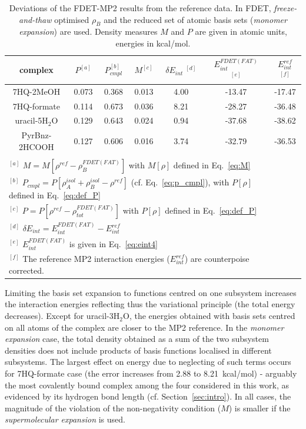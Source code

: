 \documentclass[amsmath,amssymb,preprint,aip,jcp]{revtex4-1}
\begin{document}
\begin{table}
{
\begin{center}
\begin{tabular}{|c|c|c|c|c|c|c|}
\hline
 complex & $P^{[a]}$ & $P_{cmpl}^{[b]}$ & $M^{[c]}$ & $\delta E_{int}\;^{[d]}$ & $E^{FDET(FAT)}_{int}$ $^{[e]}$ & $E_{int}^{ref}$ $^{[f]}$ \\ \hline
7HQ-2MeOH & 0.073 & 0.368 & 0.013 & 4.00 & -13.47 & -17.47 \\ \hline
7HQ-formate & 0.114 & 0.673 & 0.036 & 8.21 & -28.27 & -36.48 \\ \hline
uracil-5H$_2$O & 0.129 & 0.643 & 0.024 & 0.94 & -37.68 & -38.62 \\ \hline
PyrBnz-2HCOOH & 0.127 & 0.606 & 0.016 & 3.74 & -32.79 & -36.53 \\ \hline
\multicolumn{6}{c}{ } \\
\multicolumn{6}{l}{$^{[a]}$ $M=M[\rho^{ref} - \rho^{FDET(FAT)}_{B}]$ with $M[\rho]$ defined in Eq.~\ref{eq:M}}\\
\multicolumn{6}{l}{$^{[b]}$ $P_{cmpl}=P[\rho_A^{isol}+\rho_B^{isol} - \rho^{ref}]$ (cf. Eq.~\ref{eq:p_cmpl}), with $P[\rho]$ defined in Eq.~\ref{eq:def_P}}\\
\multicolumn{6}{l}{$^{[c]}$ $P=P[\rho^{ref} - \rho_{tot}^{FDET(FAT)}]$ with $P[\rho]$ defined in Eq.~\ref{eq:def_P}}\\
\multicolumn{6}{l}{$^{[d]}$ $\delta E_{int}=E^{FDET(FAT)}_{int}-E_{int}^{ref}$} \\
\multicolumn{6}{l}{$^{[e]}$ $E^{FDET(FAT)}_{int}$ is given in Eq.~\ref{eq:eint4}}\\
\multicolumn{6}{l}{$^{[f]}$ The reference MP2 interaction energies ($E_{int}^{ref}$) are counterpoise corrected.}
\end{tabular}
\end{center}
}%
\caption{Deviations of the FDET-MP2 results from the reference data. In FDET, \textit{freeze-and-thaw} optimised $\rho_B$ and the reduced set of atomic basis sets ({\it monomer expansion}) are used. Density measures $M$ and $P$ are given in atomic units, energies in kcal/mol.
}
\label{table:ME_FAT}
\end{table}

Limiting the basis set expansion to functions centred on one subsystem increases the interaction energies reflecting thus the variational principle (the total energy decreases). Except for uracil-3H$_2$O, the energies obtained with basis sets centred on all atoms of the complex are closer to the MP2 reference. In the {\it monomer expansion} case, the total density obtained as a sum of the two subsystem densities
does not include products of basis functions localised in different subsystems. The largest effect on energy due to neglecting of such terms occurs for 7HQ-formate case (the error increases from 2.88 to 8.21~kcal/mol) - arguably the most covalently bound complex among the four considered in this work, as evidenced by its hydrogen bond length (cf. Section~\ref{sec:intro}). In all cases, the magnitude of the violation of the non-negativity condition ($M$) is smaller if the {\it supermolecular expansion} is used. 
\end{document}
